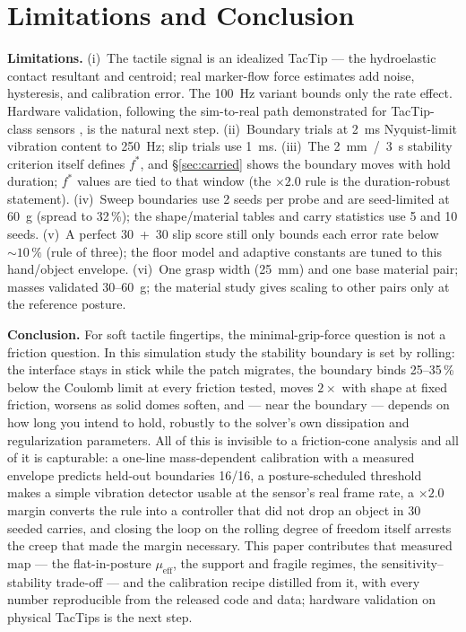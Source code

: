 \documentclass[journal]{IEEEtran}
\newcommand{\mueff}{\mu_{\mathrm{eff}}}
\newcommand{\fstar}{f^{*}}
\begin{document}
\section{Limitations and Conclusion}
\label{sec:limitations}

\textbf{Limitations.} (i)~The tactile signal is an idealized TacTip --- the
hydroelastic contact resultant and centroid; real marker-flow force
estimates add noise, hysteresis, and calibration error. The 100~Hz variant
bounds only the rate effect. Hardware validation, following the sim-to-real
path demonstrated for TacTip-class sensors \cite{lin2022tactilegym2}, is
the natural next step. (ii)~Boundary trials at 2~ms Nyquist-limit vibration
content to 250~Hz; slip trials use 1~ms. (iii)~The 2~mm~/~3~s stability
criterion itself defines $\fstar$, and \S\ref{sec:carried} shows the
boundary moves with hold duration; $\fstar$ values are tied to that window
(the $\times 2.0$ rule is the duration-robust statement). (iv)~Sweep
boundaries use 2 seeds per probe and are seed-limited at 60~g (spread to
32\,\%); the shape/material tables and carry statistics use 5 and 10 seeds.
(v)~A perfect 30~+~30 slip score still only bounds each error rate below
${\sim}10\,\%$ (rule of three); the floor model and adaptive constants are
tuned to this hand/object envelope. (vi)~One grasp width (25~mm) and one
base material pair; masses validated 30--60~g; the material study gives
scaling to other pairs only at the reference posture.

\textbf{Conclusion.} For soft tactile fingertips, the minimal-grip-force
question is not a friction question. In this simulation study the
stability boundary is set by rolling: the interface stays in stick while
the patch migrates, the boundary binds 25--35\,\% below the Coulomb limit
at every friction tested, moves $2\times$ with shape at fixed friction,
worsens as solid domes soften, and --- near the boundary --- depends on
how long you intend to hold, robustly to the solver's own dissipation and
regularization parameters. All of this is invisible to a friction-cone
analysis and all of it is capturable: a one-line mass-dependent
calibration with a measured envelope predicts held-out boundaries 16/16,
a posture-scheduled threshold makes a simple vibration detector usable at
the sensor's real frame rate, a $\times 2.0$ margin converts the rule
into a controller that did not drop an object in 30 seeded carries, and
closing the loop on the rolling degree of freedom itself arrests the
creep that made the margin necessary. This paper contributes that
measured map --- the flat-in-posture $\mueff$, the support and fragile
regimes, the sensitivity--stability trade-off --- and the calibration
recipe distilled from it, with every number reproducible from the
released code and data; hardware validation on physical TacTips is the
next step.

\balance


\end{document}

